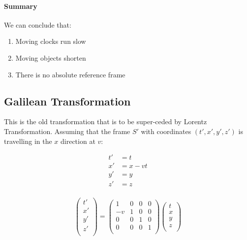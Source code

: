 \documentclass[12pt]{article}
\begin{document}
\paragraph{Summary} 
We can conclude that:
\begin{enumerate}
    \item Moving clocks run slow
    \item Moving objects shorten
    \item There is no absolute reference frame
\end{enumerate}

\subsection{Galilean Transformation}
This is the old transformation that is to be super-ceded by Lorentz Transformation. Assuming that the frame $S'$ with coordinates $(t',x',y',z')$ is travelling in the $x$ direction at $v$:

\begin{align*}
    t' &= t\\
    x' &= x - vt\\
    y' &= y\\
    z' &= z\\
\end{align*}

\begin{equation*}
    \begin{pmatrix}
    t' \\
    x' \\
    y' \\
    z' \\
    \end{pmatrix}
    =
    \begin{pmatrix}
    1 &0 &0 &0 \\
    -v &1 &0 &0 \\
    0 &0 &1 &0 \\
    0 &0 &0 &1 \\
    \end{pmatrix}
    \begin{pmatrix}
    t \\
    x \\
    y \\
    z \\
    \end{pmatrix}
\end{equation*}
\end{document}
